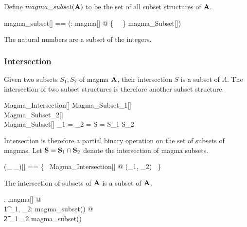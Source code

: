 \documentclass{amsart}
\begin{document}
Define $magma\_subset(\mathbf{A})$ to be the set of all subset structures of $\mathbf{A}$.

\begin{zed}
	magma\_subset[\genT] == (\lambda \strucA: magma[\genT] @ \{~ \strucA ~\} \dres magma\_Subset[\genT])
\end{zed}

\begin{example}
The natural numbers are a subset of the integers.


\end{example}

\subsubsection{Intersection}

Given two subsets $S_1, S_2$ of magma $\mathbf{A}$, their intersection $S$ is a subset
of $A$. The intersection of two subset structures is therefore another subset structure.

\begin{schema}{Magma\_Intersection}[\genT]
	Magma\_Subset_1[\genT] \\
	Magma\_Subset_2[\genT] \\
	Magma\_Subset[\genT]
\where
	\strucA_1 = \strucA_2 = \strucA
\also
	S = S_1 \cap S_2
\end{schema}

Intersection is therefore a partial binary operation on the set of subsets of magmas.
Let $\mathbf{S} = \mathbf{S}_1 \mathbin{\cap} \mathbf{S}_2$ denote the intersection of magma subsets.

\begin{zed}
	(\_ \capMagma \_)[\genT] == \{~ Magma\_Intersection[\genT] @ (\strucS_1, \strucS_2) \mapsto \strucS ~\}
\end{zed}

\begin{remark}
The intersection of subsets of $\mathbf{A}$ is a subset of $\mathbf{A}$.

\begin{zed}
	\forall \strucA: magma[\setT] @ \\
	\t1	\forall \strucS_1, \strucS_2: magma\_subset(\strucA) @ \\
	\t2		\strucS_1 \capMagma \strucS_2 \in magma\_subset(\strucA)
\end{zed}

\end{remark}
\end{document}
